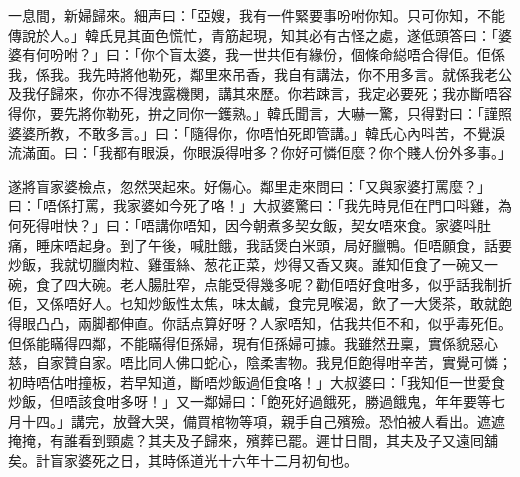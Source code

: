 \documentclass[a5paper, 12pt, openany]{book} %
\begin{document}
	一息間，新婦歸來。細声曰：「亞嫂，我有一件緊要事吩咐你知。只可你知，不能傳說於人。」韓氏見其面色慌忙，青筋起現，知其必有古怪之處，遂低頭答曰：「婆婆有何吩咐？」曰：「你个盲太婆，我一世共佢有緣份，個條命縂唔合得佢。佢係我，係我。我先時將他勒死，鄰里來吊香，我自有講法，你不用多言。就係我老公及我仔歸來，你亦不得洩露機関，講其來歷。你若踈言，我定必要死；我亦斷唔容得你，要先將你勒死，拚之同你一鑊熟。」韓氏聞言，大嚇一驚，只得對曰：「謹照婆婆所教，不敢多言。」曰：「隨得你，你唔怕死即管講。」韓氏心內呌苦，不覺淚流滿面。曰：「我都有眼淚，你眼淚得咁多？你好可憐佢麼？你个賤人份外多事。」

	遂將盲家婆檢点，忽然哭起來。好傷心。鄰里走來問曰：「又與家婆打罵麼？」曰：「唔係打罵，我家婆如今死了咯！」大叔婆驚曰：「我先時見佢在門口呌雞，為何死得咁快？」曰：「唔講你唔知，因今朝煮多契女飯，契女唔來食。家婆呌肚痛，睡床唔起身。到了午後，喊肚餓，我話煲白米頭，局好臘鴨。佢唔願食，話要炒飯，我就切臘肉粒、雞蛋絲、葱花正菜，炒得又香又爽。誰知佢食了一碗又一碗，食了四大碗。老人腸肚窄，点能受得幾多呢？勸佢唔好食咁多，似乎話我制折佢，又係唔好人。乜知炒飯性太焦，味太鹹，食完見喉渴，飲了一大煲茶，敢就飽得眼凸凸，兩脚都伸直。你話点算好呀？人家唔知，估我共佢不和，似乎毒死佢。但係能瞞得四鄰，不能瞞得佢孫婦，現有佢孫婦可據。我雖然丑稟，實係貌惡心慈，自家贊自家。唔比同人佛口蛇心，陰柔害物。我見佢飽得咁辛苦，實覺可憐；初時唔估咁撞板，若早知道，斷唔炒飯過佢食咯！」大叔婆曰：「我知佢一世愛食炒飯，但唔該食咁多呀！」又一鄰婦曰：「飽死好過餓死，勝過餓鬼，年年要等七月十四。」講完，放聲大哭，備買棺物等項，親手自己殯殮。恐怕被人看出。遮遮掩掩，有誰看到頸處？其夫及子歸來，殯葬已罷。遲廿日間，其夫及子又遠囘舖矣。計盲家婆死之日，其時係道光十六年十二月初旬也。
\end{document}
